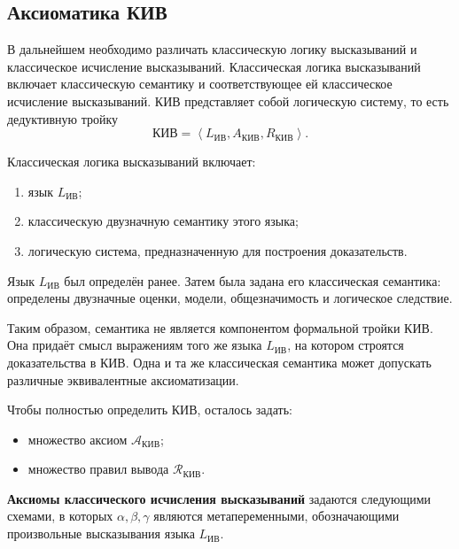 \documentclass[12pt,a4paper,oneside,openany]{book}
\theoremstyle{definition}
\theoremstyle{plain}
\theoremstyle{remark}
\begin{document}
\subsection{Аксиоматика КИВ}

В дальнейшем необходимо различать классическую логику высказываний
и классическое исчисление высказываний. Классическая логика
высказываний включает классическую семантику и соответствующее ей
классическое исчисление высказываний. КИВ представляет собой
логическую систему, то есть дедуктивную тройку
\[
    \mathrm{КИВ}
    =
    \left\langle
        L_{\mathrm{ИВ}},
        A_{\mathrm{КИВ}},
        R_{\mathrm{КИВ}}
    \right\rangle .
\]

Классическая логика высказываний включает:
\begin{enumerate}
    \item язык \(L_{\mathrm{ИВ}}\);
    \item классическую двузначную семантику этого языка;
    \item логическую система, предназначенную для построения
          доказательств.
\end{enumerate}

Язык \(L_{\mathrm{ИВ}}\) был определён ранее. Затем была задана его
классическая семантика: определены двузначные оценки, модели,
общезначимость и логическое следствие.


Таким образом, семантика не является компонентом формальной тройки
\(\mathrm{КИВ}\). Она придаёт смысл выражениям того же языка
\(L_{\mathrm{ИВ}}\), на котором строятся доказательства в КИВ.
Одна и та же классическая семантика может допускать различные эквивалентные аксиоматизации.

Чтобы полностью определить КИВ, осталось задать:
\begin{itemize}
    \item множество аксиом \(\mathcal A_{\mathrm{КИВ}}\);
    \item множество правил вывода \(\mathcal R_{\mathrm{КИВ}}\).
\end{itemize}

\vspace{7mm}

\textbf{Аксиомы классического исчисления высказываний} задаются следующими схемами, в которых
\(\alpha,\beta,\gamma\) являются метапеременными, обозначающими
произвольные высказывания языка \(L_{\mathrm{ИВ}}\).
\end{document}
